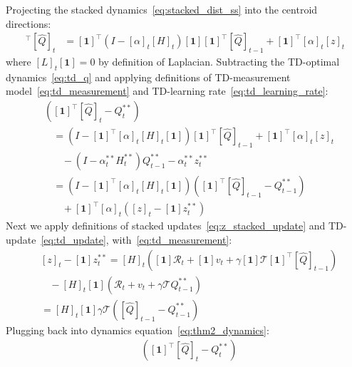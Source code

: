 \documentclass[journal]{IEEEtran}
\begin{document}
\begin{IEEEproof}
    \label{proof:tracking}
    Projecting the stacked dynamics~\eqref{eq:stacked_dist_ss} into the centroid directions:
    \begin{align*}
        [\boldsymbol{1}]^\intercal [\hat{Q}]_t &= [\boldsymbol{1}]^\intercal(I - [\alpha]_t [H]_t) [\boldsymbol{1}] [\boldsymbol{1}]^\intercal [\hat{Q}]_{t-1} + [\boldsymbol{1}]^\intercal [\alpha]_t [z]_t 
    \end{align*}
    where $[L]_t [\boldsymbol{1}] = 0$ by definition of Laplacian. Subtracting the TD-optimal dynamics~\eqref{eq:td_q} and applying definitions of TD-measurement model~\eqref{eq:td_measurement} and TD-learning rate~\eqref{eq:td_learning_rate}:
    \begin{align}
        & ([\boldsymbol{1}]^\intercal [\hat{Q}]_t - Q^{**}_t) \nonumber \\
        & \ \ \ \ = (I - [\boldsymbol{1}]^\intercal [\alpha]_t [H]_t [\boldsymbol{1}]) [\boldsymbol{1}]^\intercal [\hat{Q}]_{t-1} + [\boldsymbol{1}]^\intercal [\alpha]_t [z]_t \nonumber \\
        & \ \ \ \ \ \ \ \ - (I - \alpha^{**}_t H^{**}_t) Q^{**}_{t-1} - \alpha^{**}_t z^{**}_t \nonumber \\
        & \ \ \ \ = (I - [\boldsymbol{1}]^\intercal [\alpha]_t [H]_t [\boldsymbol{1}]) ([\boldsymbol{1}]^\intercal [\hat{Q}]_{t-1} - Q^{**}_{t-1}) \nonumber \\
        & \ \ \ \ \ \ \ \ + [\boldsymbol{1}]^\intercal [\alpha]_t ( [z]_t - [\boldsymbol{1}] z^{**}_t) \label{eq:thm2_dynamics}
    \end{align}
    Next we apply definitions of stacked updates~\eqref{eq:z_stacked_update} and TD-update~\eqref{eq:td_update}, with~\eqref{eq:td_measurement}:
    \begin{align*}
        &[z]_t - [\boldsymbol{1}] z^{**}_t = [H]_t ( [\boldsymbol{1}] \mathcal{R}_t + [\boldsymbol{1}] v_t + \gamma [\boldsymbol{1}] \mathcal{T} [\boldsymbol{1}]^\intercal  [\hat{Q}]_{t-1}) \\
        & \ \ \ \ - [H]_t [\boldsymbol{1}]( \mathcal{R}_t + v_t + \gamma \mathcal{T} Q^{**}_{t-1}) \\
        &= [H]_t [\boldsymbol{1}] \gamma \mathcal{T}( [\hat{Q}]_{t-1} - Q^{**}_{t-1}) 
    \end{align*}
    Plugging back into dynamics equation~\eqref{eq:thm2_dynamics}:
    \begin{align*}
        & ([\boldsymbol{1}]^\intercal [\hat{Q}]_t - Q^{**}_t) \\ 

\end{align*}
\end{IEEEproof}
\end{document}

